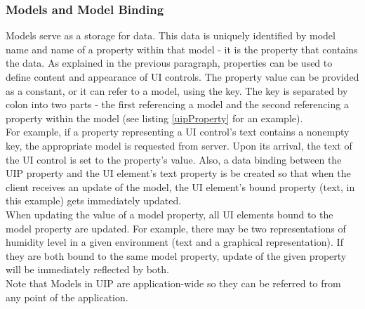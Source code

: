 

\subsubsection{Models and Model Binding}
Models serve as a storage for data. This data is uniquely identified by model name and name of a property within that model - it is the property that contains the data. As explained in the previous paragraph, properties can be used to define content and appearance of UI controls. The property value can be provided as a constant, or it can refer to a model, using the key. The key is separated by colon into two parts - the first referencing a model and the second referencing a property within the model (see listing \ref{uipProperty} for an example).\\
For example, if a property representing a UI control's text contains a nonempty key, the appropriate model is requested from server. Upon its arrival, the text of the UI control is set to the property's value. Also, a data binding between the UIP property and the UI element's text property is be created so that when the client receives an update of the model, the UI element's bound property (text, in this example) gets immediately updated.
\\
When updating the value of a model property, all UI elements bound to the model property are updated. For example, there may be two representations of humidity level in a given environment (text and a graphical representation). If they are both bound to the same model property, update of the given property will be immediately reflected by both.\\
Note that Models in UIP are application-wide so they can be referred to from any point of the application.

\endinput